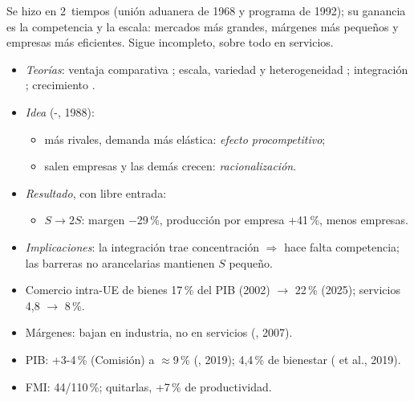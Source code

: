 \documentclass{article}
\begin{document}
\begin{columnas}
\begin{ideaclave}
Se hizo en 2~tiempos (unión aduanera de 1968 y programa de 1992); su ganancia es la competencia y la escala: mercados más grandes, márgenes más pequeños y empresas más eficientes. Sigue incompleto, sobre todo en servicios.
\end{ideaclave}

\begin{itemize}
\item \emph{Teorías}: ventaja comparativa ; escala, variedad y heterogeneidad ; integración ; crecimiento .
\end{itemize}
\begin{itemize}
\item \emph{Idea} (-, 1988):
  \begin{itemize}
  \item más rivales, demanda más elástica: \emph{efecto procompetitivo};
  \item salen empresas y las demás crecen: \emph{racionalización}.
  \end{itemize}
\item \emph{Resultado}, con libre entrada:
  \begin{itemize}
  \item $S\to2S$: margen $-$29\,\%, producción por empresa +41\,\%, menos empresas.
  \end{itemize}
\item \emph{Implicaciones}: la integración trae concentración $\Rightarrow$ hace falta competencia; las barreras no arancelarias mantienen $S$ pequeño.
\end{itemize}
\begin{itemize}
\item Comercio intra-UE de bienes 17\,\% del PIB (2002) $\to$ 22\,\% (2025); servicios 4,8 $\to$ 8\,\%.
\item Márgenes: bajan en industria, no en servicios (, 2007).
\item PIB: +3-4\,\% (Comisión) a $\approx$9\,\% (, 2019); 4,4\,\% de bienestar ( et al., 2019).
\item FMI: 44/110\,\%; quitarlas, +7\,\% de productividad.
\end{itemize}


\end{columnas}
\end{document}
